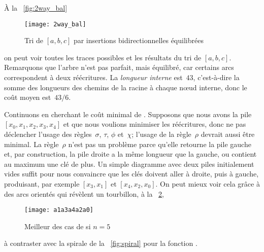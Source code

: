 À la \fig~\vref{fig:2way_bal}
\begin{figure}
\centering
\texttt{[image: 2way\_bal]}
\caption{Tri de \([a,b,c]\) par insertions bidirectionnelles équilibrées}
\label{fig:2way_bal}
\end{figure}
on peut voir toutes les traces possibles et les résultats du tri de \([a,b,c]\). Remarquons que
l'arbre n'est pas parfait, mais équilibré,
car certains arcs correspondent à deux réécritures. La \emph{longueur
  interne}\label{insertion__internal_path_length}  est~\(43\), c'est-à-dire la somme des
longueurs des chemins de la racine à chaque n{\oe}ud interne, donc le
coût moyen est~\(43/6\).


Continuons en cherchant le coût minimal de . Supposons que
nous avons la pile \([x_0, x_1, x_2, x_3, x_4]\) et que nous voulions
minimiser les réécritures, donc ne pas déclencher l'usage des
règles~\(\sigma\), \(\tau\), \(\phi\) et~\(\chi\); l'usage de la
règle~\(\rho\) devrait aussi être minimal. La règle~\(\rho\) n'est pas
un problème parce qu'elle retourne la pile gauche et, par
construction, la pile droite a la même longueur que la gauche, ou
contient au maximum une clé de plus. Un simple diagramme avec deux
piles initialement vides suffit pour nous convaincre que les clés
doivent aller à droite, puis à gauche, produisant, par exemple \([x_3
, x_1]\) et \([x_4, x_2, x_0]\). On peut mieux voir cela grâce à des
arcs orientés qui révèlent un tourbillon, à la
\fig~\ref{fig:whirlpool},
\begin{figure}[b]
\centering
\texttt{[image: a1a3a4a2a0]}
\caption{Meilleur des cas de  si \(n=5\)}
\label{fig:whirlpool}
\end{figure}
à contraster avec la spirale de la \fig~\vref{fig:spiral} pour
la fonction .

